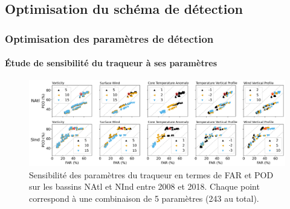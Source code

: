 \documentclass[aspectratio=169, usepdftitle=false, xcolor={dvipsnames}, 9pt,table]{beamer}
\begin{document}
\subsection*{Optimisation du schéma de détection}

\begin{frame}[c]
    \frametitle{Optimisation des paramètres de détection}
    \framesubtitle{Étude de sensibilité du traqueur à ses paramètres}
    \begin{figure}
        \centering
        \includegraphics[width=\textwidth]{Figures/optimisation_vectors.png}
        \caption{\small Sensibilité des paramètres du traqueur en termes de FAR et POD sur les bassins NAtl et NInd entre 2008 et 2018. Chaque point correspond
        à une combinaison de 5 paramètres (243 au total).}
    \end{figure}
\end{frame}

\end{document}
